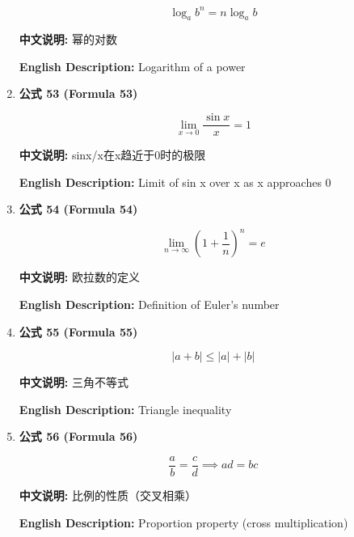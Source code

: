 \documentclass[12pt,a4paper]{article}
\begin{document}
\begin{enumerate}[leftmargin=*]
\begin{equation}
\log_a{b^n} = n \log_a{b}
\end{equation}

\textbf{中文说明:} 幂的对数

\textbf{English Description:} Logarithm of a power

\vspace{0.5cm}

\item \textbf{公式 53 (Formula 53)}

\begin{equation}
\lim_{x \to 0} \frac{\sin x}{x} = 1
\end{equation}

\textbf{中文说明:} sinx/x在x趋近于0时的极限

\textbf{English Description:} Limit of sin x over x as x approaches 0

\vspace{0.5cm}

\item \textbf{公式 54 (Formula 54)}

\begin{equation}
\lim_{n \to \infty} \left(1 + \frac{1}{n}\right)^n = e
\end{equation}

\textbf{中文说明:} 欧拉数的定义

\textbf{English Description:} Definition of Euler's number

\vspace{0.5cm}

\item \textbf{公式 55 (Formula 55)}

\begin{equation}
|a+b| \leq |a| + |b|
\end{equation}

\textbf{中文说明:} 三角不等式

\textbf{English Description:} Triangle inequality

\vspace{0.5cm}

\item \textbf{公式 56 (Formula 56)}

\begin{equation}
\frac{a}{b} = \frac{c}{d} \implies ad = bc
\end{equation}

\textbf{中文说明:} 比例的性质（交叉相乘）

\textbf{English Description:} Proportion property (cross multiplication)


\end{enumerate}
\end{document}

